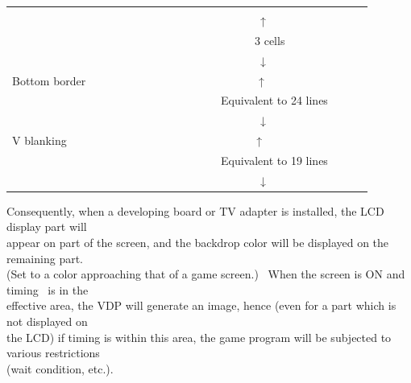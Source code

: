 \documentclass[a4paper,10pt]{article}
\begin{document}
\begin{tabular}{|l|l|l|cc|l}
& & & & &\\[-1.2em]
\cline{2-2}
\multicolumn{3}{|l|}{\ \ \ \ \ \ \ \ \ \ \ \ \ \ \ \ \ \ \ \ \ \ \ \ \ \ \ \ \ \ \ \ \ \ \ \ \ \ \ \ \ \ \ \ ↑} & & &\\[-1.2em]
\multicolumn{3}{|l|}{\ \ \ \ \ \ \ \ \ \ \ \ \ \ \ \ \ \ \ \ \ \ \ \ \ \ \ \ \ \ \ \ \ \ \ \ \ \ \ \ \ \ \ 3 cells} & & &\\[-1.2em]
\multicolumn{3}{|l|}{\ \ \ \ \ \ \ \ \ \ \ \ \ \ \ \ \ \ \ \ \ \ \ \ \ \ \ \ \ \ \ \ \ \ \ \ \ \ \ \ \ \ \ \ ↓} & & &\\
\cline{1-3}
\multicolumn{3}{|l|}{Bottom border \ \ \ \ \ \ \ \ \ \ \ \ \ \ \ \ \ \ \ \ \ \ \ \ \ \ \ \ \ \ ↑} & & &\\[-1.2em]
\multicolumn{3}{|l|}{\ \ \ \ \ \ \ \ \ \ \ \ \ \ \ \ \ \ \ \ \ \ \ \ \ \ \ \ \ \ \ \ \ \ \ \ \ Equivalent to 24 lines} & & &\\[-1.2em]
\multicolumn{3}{|l|}{\ \ \ \ \ \ \ \ \ \ \ \ \ \ \ \ \ \ \ \ \ \ \ \ \ \ \ \ \ \ \ \ \ \ \ \ \ \ \ \ \ \ \ \ ↓} & & &\\
\cline{1-3}
\multicolumn{3}{|l|}{V blanking \ \ \ \ \ \ \ \ \ \ \ \ \ \ \ \ \ \ \ \ \ \ \ \ \ \ \ \ \ \ \ \ \ ↑} & & &\\[-1.2em]
\multicolumn{3}{|l|}{\ \ \ \ \ \ \ \ \ \ \ \ \ \ \ \ \ \ \ \ \ \ \ \ \ \ \ \ \ \ \ \ \ \ \ \ \ Equivalent to 19 lines} & & &\\[-1.2em]
\multicolumn{3}{|l|}{\ \ \ \ \ \ \ \ \ \ \ \ \ \ \ \ \ \ \ \ \ \ \ \ \ \ \ \ \ \ \ \ \ \ \ \ \ \ \ \ \ \ \ \ ↓} & & &\\
\cline{1-3}
\cline{5-5}
\end{tabular}

\vspace{3em}
Consequently, when a developing board or TV adapter is installed, the LCD display part will\\
appear on part of the screen, and the backdrop color will be displayed on the remaining part.\\
(Set to a color approaching that of a game screen.) \ When the screen is ON and timing \ is in the\\
effective area, the VDP will generate an image, hence (even for a part which is not displayed on\\
the LCD) if timing is within this area, the game program will be subjected to various restrictions\\
(wait condition, etc.).\\

{}
\end{document}
